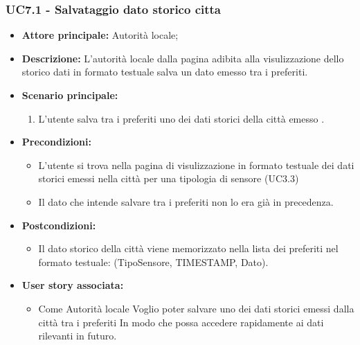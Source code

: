 \documentclass{article}
\begin{document}
\subsubsection{UC7.1 - Salvataggio dato storico citta}
\begin{itemize}
    \item \textbf{Attore principale:} Autorità locale;
    \item \textbf{Descrizione:} L’autorità locale dalla pagina adibita alla visulizzazione dello storico dati in formato testuale salva un dato emesso tra i preferiti.
    \item \textbf{Scenario principale:}
          \begin{enumerate}
              \item L'utente salva tra i preferiti uno dei dati storici della città emesso .
          \end{enumerate}
    \item \textbf{Precondizioni:}
          \begin{itemize}
              \item  L'utente si trova nella pagina di visulizzazione in formato testuale dei dati storici emessi nella città per una tipologia di sensore (UC3.3)
              \item  Il dato che intende salvare tra i preferiti non lo era già in precedenza.
          \end{itemize}
    \item \textbf{Postcondizioni:}
          \begin{itemize}
              \item  Il dato storico della città viene memorizzato nella lista dei preferiti nel
                    formato testuale: (TipoSensore,
                    TIMESTAMP, Dato).
          \end{itemize}
    \item \textbf{User story associata:}
          \begin{itemize}
              \item Come Autorità locale
                    Voglio poter salvare uno dei dati storici emessi dalla città tra i preferiti
                    In modo che possa accedere rapidamente ai dati rilevanti in futuro.
          \end{itemize}
\end{itemize}

\end{document}
